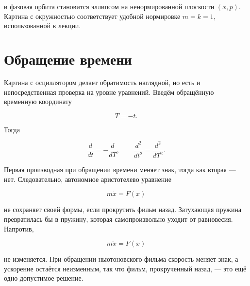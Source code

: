 и фазовая орбита становится эллипсом на ненормированной плоскости \((x,p)\). Картина с окружностью соответствует удобной нормировке \(m=k=1\), использованной в лекции.

\begin{classroomqa}
\end{classroomqa}

\section{Обращение времени}

Картина с осциллятором делает обратимость наглядной, но есть и непосредственная проверка на уровне уравнений. Введём обращённую временную координату

\begin{equation}
  T=-t.
  \label{eq:reverse-time}
\end{equation}

Тогда

\begin{equation}
  \frac{d}{dt}=-\frac{d}{dT},
  \qquad
  \frac{d^2}{dt^2}=\frac{d^2}{dT^2}.
  \label{eq:time-derivative-parity}
\end{equation}

Первая производная при обращении времени меняет знак, тогда как вторая — нет. Следовательно, автономное аристотелево уравнение

\begin{equation}
  m\dot x=F(x)
  \label{eq:aristotle-time-reversal}
\end{equation}

не сохраняет своей формы, если прокрутить фильм назад. Затухающая пружина превратилась бы в пружину, которая самопроизвольно уходит от равновесия. Напротив,

\begin{equation}
  m\ddot x=F(x)
  \label{eq:newton-time-reversal}
\end{equation}

не изменяется. При обращении ньютоновского фильма скорость меняет знак, а ускорение остаётся неизменным, так что фильм, прокрученный назад, — это ещё одно допустимое решение.

